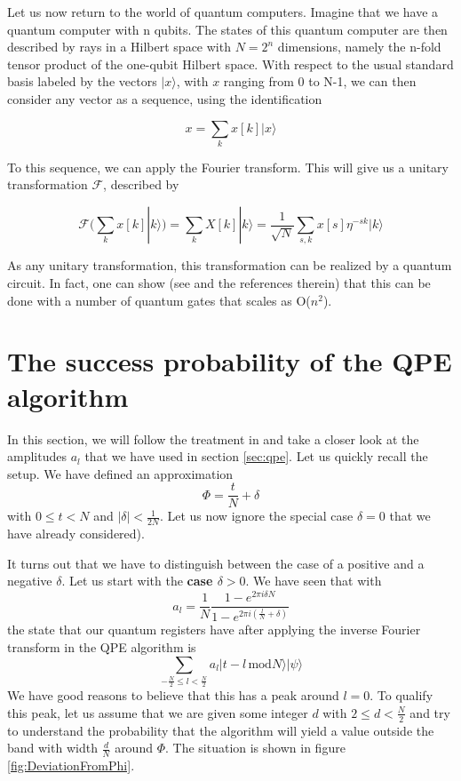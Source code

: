 \documentclass[a4paper, draft]{article}
\theoremstyle{own}
\theoremstyle{remark}
\begin{document}
Let us now return to the world of quantum computers. Imagine that we have a quantum computer with n qubits. The states of this quantum computer are then described by rays in a Hilbert space with $N=2^n$ dimensions, namely the n-fold tensor product of the one-qubit Hilbert space. With respect to the usual standard basis labeled by the vectors $|x \rangle $, with $x$ ranging from 0 to N-1, we can then consider any vector as a sequence, using the identification

$$
x = \sum_k x[k] |x \rangle
$$

To this sequence, we can apply the Fourier transform. This will give us a unitary transformation $\mathcal{F}$, described by

$$
\mathcal{F}(\sum_k x[k] |k \rangle) = \sum_k X[k] |k \rangle 
= \frac{1}{\sqrt{N}} \sum_{s,k} x[s] \eta^{-sk} |k\rangle 
$$

As any unitary transformation, this transformation can be realized by a quantum circuit. In fact, one can show (see \cite{Shor96} and the references therein) that this can be done with a number of quantum gates that scales as O($n^2$). 

\section{The success probability of the QPE algorithm}\label{app:successprobability}

In this section, we will follow the treatment in \cite{CleveEkert} and take a closer look at the amplitudes $a_l$ that we have used in section \ref{sec:qpe}. Let us quickly recall the setup. We have defined an approximation
$$
\Phi = \frac{t}{N} + \delta
$$
with $0 \leq t < N$ and $|\delta| < \frac{1}{2N}$. Let us now  ignore the special case $\delta = 0$ that we have already considered). 


It turns out that we have to distinguish between the case of a positive and a negative $\delta$. Let us start with the {\bf case $\delta > 0$}. We have seen that with
$$
a_l = \frac{1}{N} \frac{1 - e^{2\pi i \delta N}}
{1 - e^{2\pi i (\frac{l}{N} + \delta) }}
$$
the state that our quantum registers have after applying the inverse Fourier transform in the QPE algorithm is
$$
\sum_{- \frac{N}{2} \leq l < \frac{N}{2}} a_l | t - l \, \text{mod} N \rangle |\psi \rangle
$$
We have good reasons to believe that this has a peak around $l = 0$. To qualify this peak, let us assume that we are given some integer $d$ with $2 \leq d < \frac{N}{2}$ and try to understand the probability that the algorithm will yield a value outside the band with width $\frac{d}{N}$ around $\Phi$. The situation is shown in figure \ref{fig:DeviationFromPhi}.
\end{document}
